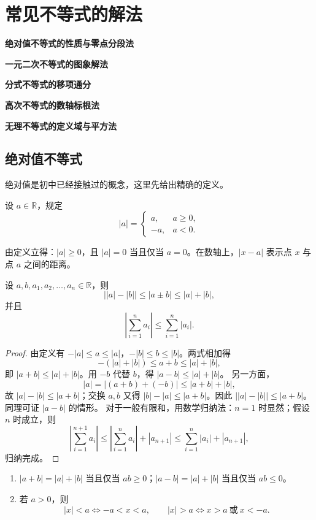 \section{常见不等式的解法}
\begin{know}
  \item \textbf{绝对值不等式的性质与零点分段法}
  \item \textbf{一元二次不等式的图象解法}
  \item \textbf{分式不等式的移项通分}
  \item \textbf{高次不等式的数轴标根法}
  \item \textbf{无理不等式的定义域与平方法}
\end{know}

\subsection{绝对值不等式}
绝对值是初中已经接触过的概念，这里先给出精确的定义。
\begin{definition}[绝对值]\label{def:绝对值}
  设 \(a\in\mathbb R\)，规定
  \[
  |a|=
  \begin{cases}
    a,&a\ge 0,\\
    -a,&a<0.
  \end{cases}
  \]
\end{definition}
由定义立得：\(|a|\ge 0\)，且 \(|a|=0\) 当且仅当 \(a=0\)。在数轴上，\(|x-a|\) 表示点 \(x\) 与点 \(a\) 之间的距离。

\begin{theorem}[绝对值不等式]
  设 \(a,b,a_1,a_2,\dots,a_n\in\mathbb R\)，则
  \[
  \left||a|-|b|\right|\le |a\pm b|\le |a|+|b|,
  \]
  并且
  \[
  \left|\sum_{i=1}^{n}a_i\right|\le\sum_{i=1}^{n}|a_i|.
  \]
\end{theorem}
\begin{proof}
  由定义有 \(-|a|\le a\le |a|\)，\(-|b|\le b\le |b|\)。两式相加得
  \[
  -(|a|+|b|)\le a+b\le |a|+|b|,
  \]
  即 \(|a+b|\le |a|+|b|\)。用 \(-b\) 代替 \(b\)，得 \(|a-b|\le |a|+|b|\)。
  另一方面，
  \[
  |a|=|(a+b)+(-b)|\le |a+b|+|b|,
  \]
  故 \(|a|-|b|\le |a+b|\)；交换 \(a,b\) 又得 \(|b|-|a|\le |a+b|\)。因此
  \(\left||a|-|b|\right|\le |a+b|\)。同理可证 \(|a-b|\) 的情形。
  对于一般有限和，用数学归纳法：\(n=1\) 时显然；假设 \(n\) 时成立，则
  \[
  \left|\sum_{i=1}^{n+1}a_i\right|
  \le \left|\sum_{i=1}^{n}a_i\right|+|a_{n+1}|
  \le \sum_{i=1}^{n}|a_i|+|a_{n+1}|,
  \]
  归纳完成。
\end{proof}

\begin{corollary}
  \begin{enumerate}
    \item \(|a+b|=|a|+|b|\) 当且仅当 \(ab\ge 0\)；\(|a-b|=|a|+|b|\) 当且仅当 \(ab\le 0\)。
    \item 若 \(a>0\)，则
    \[
    |x|<a\iff -a<x<a,\qquad |x|>a\iff x>a\ \text{或}\ x<-a.
    \]
  \end{enumerate}
\end{corollary}

